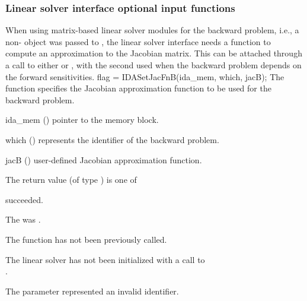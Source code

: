 
\subsubsection{Linear solver interface optional input functions}

When using matrix-based linear solver modules for the backward
problem, i.e., a non- {\sunmatrix} object  was passed
to , the {\idals} linear solver interface
needs a function to compute an approximation to the Jacobian matrix.
This can be attached through a call to either  or
, with the second used when the backward problem
depends on the forward sensitivities.
{
  flag = IDASetJacFnB(ida\_mem, which, jacB);
}
{
  The function  specifies the Jacobian
  approximation function to be used for the backward problem.
}
{
  \begin{args}
  \item[ida\_mem] ()
    pointer to the {\idas} memory block.
  \item[which] ()
    represents the identifier of the backward problem.
  \item[jacB] ()
    user-defined Jacobian approximation function.
  \end{args}
}
{
  The return value  (of type ) is one of
  \begin{args}
  \item[\Id{IDALS\_SUCCESS}]
     succeeded.
  \item[\Id{IDALS\_MEM\_NULL}]
    The  was .
  \item[\Id{IDALS\_NO\_ADJ}]
    The function  has not been previously called.
  \item[\Id{IDALS\_LMEM\_NULL}]
    The linear solver has not been initialized with a call to \\ \noindent
    .
  \item[\Id{IDALS\_ILL\_INPUT}]
    The parameter  represented an invalid identifier.
  \end{args}
}
